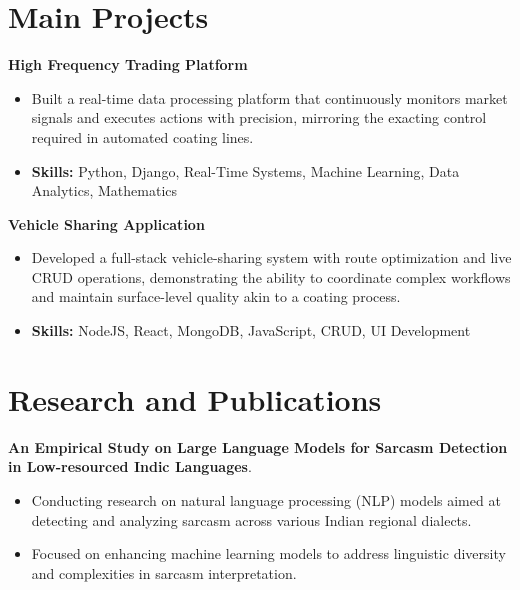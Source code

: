 \documentclass[a4paper,11pt]{article}
\begin{document}
\section{\textbf{Main Projects}}

\vspace{1mm}
  \textbf{High Frequency Trading Platform  }
\vspace{-1.5mm} %
\begin{itemize}
  \item Built a real-time data processing platform that continuously monitors market signals and executes actions with precision, mirroring the exacting control required in automated coating lines.
\vspace{-3mm}
  \item \textbf{Skills:} Python, Django, Real-Time Systems, Machine Learning, Data Analytics, Mathematics
\end{itemize}


\vspace{1mm}
   \textbf{Vehicle Sharing Application }
\vspace{-1.5mm} %
\begin{itemize}
  \item Developed a full-stack vehicle-sharing system with route optimization and live CRUD operations, demonstrating the ability to coordinate complex workflows and maintain surface-level quality akin to a coating process.
\vspace{-3mm}
  \item \textbf{Skills:} NodeJS, React, MongoDB, JavaScript, CRUD, UI Development
\end{itemize}



\section{\textbf{Research and Publications} \hfill }
\vspace{1mm}
  \textbf{An Empirical Study on Large Language Models for Sarcasm Detection in Low-resourced Indic Languages}.
\vspace{-1mm} %
\begin{itemize}
  \item Conducting research on natural language processing (NLP) models aimed at detecting and analyzing sarcasm across various Indian regional dialects.
\vspace{-3mm}
  \item Focused on enhancing machine learning models to address linguistic diversity and complexities in sarcasm interpretation.
\end{itemize}
\end{document}
